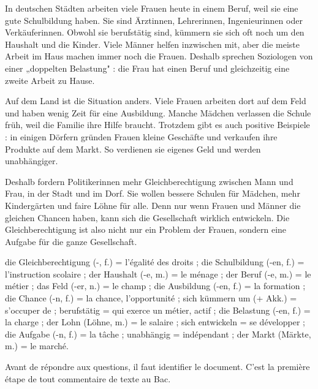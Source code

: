 \documentclass[11pt]{article}
\newcounter{popsec}
\newcounter{popsub}
\newcommand{\courssub}[1]{%
  \stepcounter{popsub}%
  \par\vspace{9pt}\noindent{\popxbold\fontsize{11.5}{13}\selectfont\color{popink}{\color{poporange}\thepopsec.\thepopsub}\hspace{6pt}#1}\par\nopagebreak\vspace{4pt}
}
\begin{document}
\begin{textebox}
In deutschen Städten arbeiten viele Frauen heute in einem Beruf, weil sie eine gute Schulbildung haben. Sie sind Ärztinnen, Lehrerinnen, Ingenieurinnen oder Verkäuferinnen. Obwohl sie berufstätig sind, kümmern sie sich oft noch um den Haushalt und die Kinder. Viele Männer helfen inzwischen mit, aber die meiste Arbeit im Haus machen immer noch die Frauen. Deshalb sprechen Soziologen von einer „doppelten Belastung" : die Frau hat einen Beruf und gleichzeitig eine zweite Arbeit zu Hause.

Auf dem Land ist die Situation anders. Viele Frauen arbeiten dort auf dem Feld und haben wenig Zeit für eine Ausbildung. Manche Mädchen verlassen die Schule früh, weil die Familie ihre Hilfe braucht. Trotzdem gibt es auch positive Beispiele : in einigen Dörfern gründen Frauen kleine Geschäfte und verkaufen ihre Produkte auf dem Markt. So verdienen sie eigenes Geld und werden unabhängiger.

Deshalb fordern Politikerinnen mehr Gleichberechtigung zwischen Mann und Frau, in der Stadt und im Dorf. Sie wollen bessere Schulen für Mädchen, mehr Kindergärten und faire Löhne für alle. Denn nur wenn Frauen und Männer die gleichen Chancen haben, kann sich die Gesellschaft wirklich entwickeln. Die Gleichberechtigung ist also nicht nur ein Problem der Frauen, sondern eine Aufgabe für die ganze Gesellschaft.
\end{textebox}

\begin{textebox}
die Gleichberechtigung (-, f.) = l'égalité des droits ; die Schulbildung (-en, f.) = l'instruction scolaire ; der Haushalt (-e, m.) = le ménage ; der Beruf (-e, m.) = le métier ; das Feld (-er, n.) = le champ ; die Ausbildung (-en, f.) = la formation ; die Chance (-n, f.) = la chance, l'opportunité ; sich kümmern um (+ Akk.) = s'occuper de ; berufstätig = qui exerce un métier, actif ; die Belastung (-en, f.) = la charge ; der Lohn (Löhne, m.) = le salaire ; sich entwickeln = se développer ; die Aufgabe (-n, f.) = la tâche ; unabhängig = indépendant ; der Markt (Märkte, m.) = le marché.
\end{textebox}

\courssub{Repérage : thème, type de texte, source, public}

Avant de répondre aux questions, il faut identifier le document. C'est la première étape de tout commentaire de texte au Bac.
\end{document}
